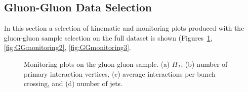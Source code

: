 \subsection{Gluon-Gluon Data Selection}

In this section a selection of kinematic and monitoring plots produced with the gluon-gluon sample selection on the full dataset is shown 
(Figures~\ref{fig:GGmonitoring1}, \ref{fig:GGmonitoring2}, \ref{fig:GGmonitoring3}. 


\begin{figure}[htb]
 \centering
 \caption{Monitoring plots on %
 the gluon-gluon sample. (a) $H_T$, %
 (b) number of primary interaction vertices,
 (c) average interactions per bunch crossing, and 
 (d) number of jets.}
 \label{fig:GGmonitoring1}
\end{figure}

